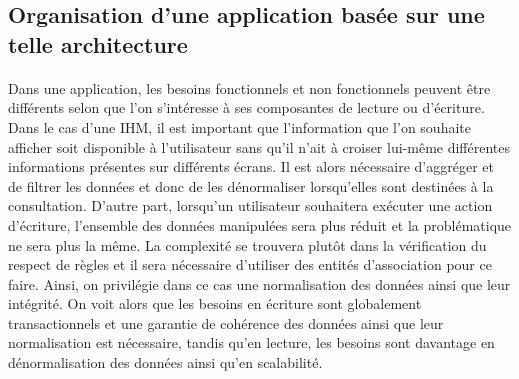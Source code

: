 \subsection{Organisation d'une application basée sur une telle architecture}
\paragraph{}
Dans une application, les besoins fonctionnels et non fonctionnels peuvent être différents selon que l'on s'intéresse à ses composantes de lecture ou d'écriture.
Dans le cas d'une IHM, il est important que l'information que l'on souhaite afficher soit disponible à l'utilisateur sans qu'il n'ait à croiser lui-même différentes informations présentes sur différents écrans.
Il est alors nécessaire d'aggréger et de filtrer les données et donc de les dénormaliser lorsqu'elles sont destinées à la consultation.
D'autre part, lorsqu'un utilisateur souhaitera exécuter une action d'écriture, l'ensemble des données manipulées sera plus réduit et la problématique ne sera plus la même.
La complexité se trouvera plutôt dans la vérification du respect de règles et il sera nécessaire d'utiliser des entités d'association pour ce faire.
Ainsi, on privilégie dans ce cas une normalisation des données ainsi que leur intégrité.
On voit alors que les besoins en écriture sont globalement transactionnels et une garantie de cohérence des données ainsi que leur normalisation est nécessaire, tandis qu'en lecture, les besoins sont davantage en dénormalisation des données ainsi qu'en scalabilité.
